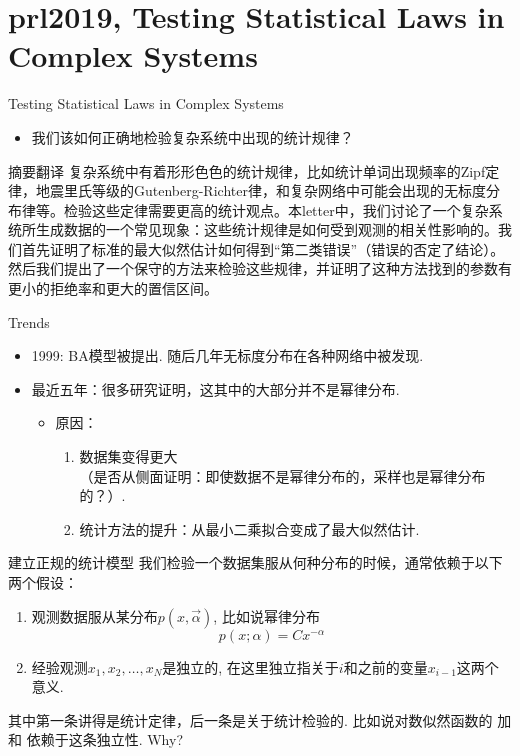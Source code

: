 \documentclass{beamer}
\begin{document}
\section{prl2019, Testing Statistical Laws in Complex Systems}
\begin{frame}{Testing Statistical Laws in Complex Systems}
    \begin{itemize}
        \item 我们该如何正确地检验复杂系统中出现的统计规律？
    \end{itemize}
\end{frame}
\begin{frame}{摘要翻译}
    复杂系统中有着形形色色的统计规律，比如统计单词出现频率的Zipf定律，地震里氏等级的Gutenberg-Richter律，和复杂网络中可能会出现的无标度分布律等。检验这些定律需要更高的统计观点。本letter中，我们讨论了一个复杂系统所生成数据的一个常见现象：这些统计规律是如何受到观测的相关性影响的。我们首先证明了标准的最大似然估计如何得到“第二类错误”（错误的否定了结论）。然后我们提出了一个保守的方法来检验这些规律，并证明了这种方法找到的参数有更小的拒绝率和更大的置信区间。
\end{frame}
\begin{frame}{Trends}
    \begin{itemize}
        \item 1999: BA模型被提出. 随后几年无标度分布在各种网络中被发现. 
        \item 最近五年：很多研究证明，这其中的大部分并不是幂律分布.
        \begin{itemize}
            \item 原因：
            \begin{enumerate}
                \item 数据集变得更大\\（是否从侧面证明：即使数据不是幂律分布的，采样也是幂律分布的？）.
                \item 统计方法的提升：从最小二乘拟合变成了最大似然估计. 
            \end{enumerate}
        \end{itemize}
    \end{itemize}
\end{frame}
\begin{frame}{建立正规的统计模型}
    我们检验一个数据集服从何种分布的时候，通常依赖于以下两个假设：
    \begin{enumerate}
        \item 观测数据服从某分布$p(x,\vec{\alpha})$, 比如说幂律分布$$p(x;\alpha)=Cx^{-\alpha}$$
        \item 经验观测$x_1,x_2,\dots,x_N$是独立的, 在这里独立指关于$i$和之前的变量$x_{i-1}$这两个意义.
    \end{enumerate}
    其中第一条讲得是统计定律，后一条是关于统计检验的. 比如说对数似然函数的 加和 依赖于这条独立性. Why?
\end{frame}
\end{document}
